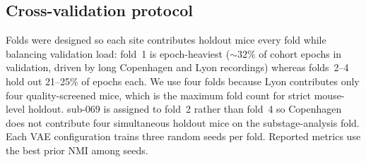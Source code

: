 \subsection{Cross-validation protocol}
\label{app:data:splits}

Folds were designed so each site contributes holdout mice every fold while balancing validation load: fold~1 is epoch-heaviest (${\sim}32\%$ of cohort epochs in validation, driven by long Copenhagen and Lyon recordings) whereas folds~2--4 hold out 21--25\% of epochs each.
We use four folds because Lyon contributes only four quality-screened mice, which is the maximum fold count for strict mouse-level holdout.
sub-069 is assigned to fold~2 rather than fold~4 so Copenhagen does not contribute four simultaneous holdout mice on the substage-analysis fold.
Each VAE configuration trains three random seeds per fold. Reported metrics use the best prior NMI among seeds.

\label{app:tab:splits}
\apptabular{}
